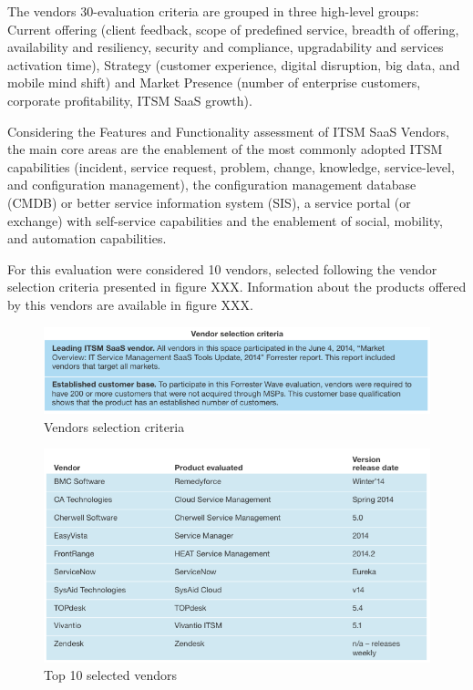The vendors 30-evaluation criteria are grouped in three high-level groups: Current offering (client feedback, scope of predefined service, breadth of offering, availability and resiliency, security and compliance, upgradability and services activation time), Strategy (customer experience, digital disruption, big data, and mobile mind shift) and Market Presence (number of enterprise customers, corporate profitability, ITSM SaaS growth).\par
Considering the Features and Functionality assessment of ITSM SaaS Vendors, the main core areas are the enablement of the most commonly adopted ITSM capabilities (incident, service request, problem, change, knowledge, service-level, and configuration management), the configuration management database (CMDB) or better service information system (SIS), a service portal (or exchange) with self-service capabilities and the enablement of social, mobility, and automation capabilities.\par
For this evaluation were considered 10 vendors, selected following the vendor selection criteria presented in figure XXX. Information about the products offered by this vendors are available in figure XXX.\par

\begin{figure}
\centering
\includegraphics{img/VendorSelectionCriteriaITSM.png}
\caption{Vendors selection criteria}
\end{figure}


\begin{figure}
\centering
\includegraphics{img/ITSMVendorsInfo.png}
\caption{Top 10 selected vendors}
\end{figure}

